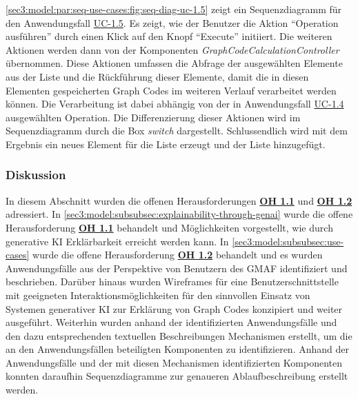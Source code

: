 

\cref{sec3:model:par:seq-use-cases:fig:seq-diag-uc-1.5} zeigt ein Sequenzdiagramm für den Anwendungsfall \hyperref[sec3:model:uc-1.5]{UC-1.5}.
Es zeigt, wie der Benutzer die Aktion \enquote{Operation ausführen} durch einen Klick auf den Knopf \enquote{Execute} initiiert.
Die weiteren Aktionen werden dann von der Komponenten \textit{GraphCodeCalculationController} übernommen.
Diese Aktionen umfassen die Abfrage der ausgewählten Elemente aus der Liste und die Rückführung dieser Elemente, damit die in diesen Elementen gespeicherten Graph Codes im weiteren Verlauf verarbeitet werden können.
Die Verarbeitung ist dabei abhängig von der in Anwendungsfall \hyperref[sec3:model:uc-1.4]{UC-1.4} ausgewählten Operation.
Die Differenzierung dieser Aktionen wird im Sequenzdiagramm durch die Box \textit{switch} dargestellt.
Schlussendlich wird mit dem Ergebnis ein neues Element für die Liste erzeugt und der Liste hinzugefügt.

\FloatBarrier

\subsubsection{Diskussion}
\label{sec3:model:subsubsec:fz1:discussion}
In diesem Abschnitt wurden die offenen Herausforderungen \hyperref[sec2:sota:oi:1.1]{\textbf{OH 1.1}} und \hyperref[sec2:sota:oi:1.1]{\textbf{OH 1.2}} adressiert.
In \cref{sec3:model:subsubsec:explainability-through-genai} wurde die offene Herausforderung \hyperref[sec2:sota:oi:1.1]{\textbf{OH 1.1}} behandelt und Möglichkeiten vorgestellt, wie durch generative KI Erklärbarkeit erreicht werden kann.
In \cref{sec3:model:subsubsec:use-cases} wurde die offene Herausforderung \hyperref[sec2:sota:oi:1.2]{\textbf{OH 1.2}} behandelt und es wurden Anwendungsfälle aus der Perspektive von Benutzern des GMAF identifiziert und beschrieben.
Darüber hinaus wurden Wireframes für eine Benutzerschnittstelle mit geeigneten Interaktionsmöglichkeiten für den sinnvollen Einsatz von Systemen generativer KI zur Erklärung von Graph Codes konzipiert und weiter ausgeführt.
Weiterhin wurden anhand der identifizierten Anwendungsfälle und den dazu entsprechenden textuellen Beschreibungen Mechanismen erstellt, um die an den Anwendungsfällen beteiligten Komponenten zu identifizieren.
Anhand der Anwendungsfälle und der mit diesen Mechanismen identifizierten Komponenten konnten daraufhin Sequenzdiagramme zur genaueren Ablaufbeschreibung erstellt werden.

